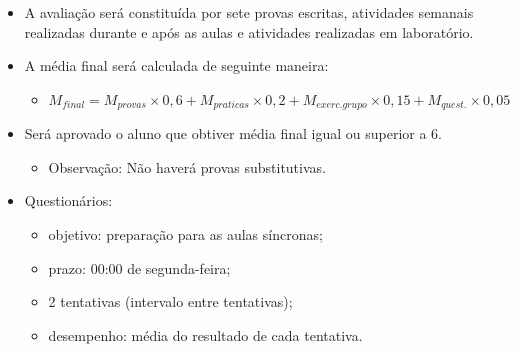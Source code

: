\begin{frame}[allowframebreaks]{\insertsubsection}
\begin{itemize}
		\item A avaliação será constituída por sete provas escritas, atividades semanais realizadas durante e após as aulas e atividades realizadas em laboratório.
		\item A média final será calculada de seguinte maneira: 
		\begin{itemize}
			\item $M_{final} = M_{provas}\times 0,6 + M_{praticas}\times 0,2 + M_{exerc.grupo} \times 0,15+ M_{quest.} \times 0,05 $
		\end{itemize}
		\item Será aprovado o aluno que obtiver média final igual ou superior a 6. 
		\begin{itemize}
			\item Observação: Não haverá provas substitutivas. 
		\end{itemize}
	\framebreak
		\item Questionários:
		\begin{itemize}
		    \item objetivo: preparação para as aulas síncronas;
		     \item prazo: 00:00 de segunda-feira;
		    \item 2 tentativas (intervalo entre tentativas);
		    \item desempenho: média do resultado de cada tentativa.
		\end{itemize}
		

\end{itemize}
\end{frame}
